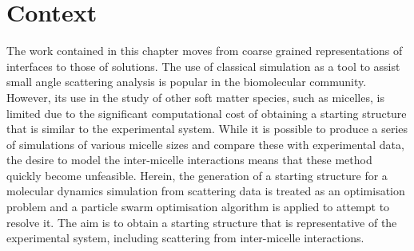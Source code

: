 \section*{Context}
The work contained in this chapter moves from coarse grained representations of interfaces to those of solutions.
The use of classical simulation as a tool to assist small angle scattering analysis is popular in the biomolecular community.\autocite{perkins_atomistic_2016,hub_interpreting_2018}
However, its use in the study of other soft matter species, such as micelles, is limited due to the significant computational cost of obtaining a starting structure that is similar to the experimental system.
While it is possible to produce a series of simulations of various micelle sizes and compare these with experimental data, the desire to model the inter-micelle interactions means that these method quickly become unfeasible.
Herein, the generation of a starting structure for a molecular dynamics simulation from scattering data is treated as an optimisation problem and a particle swarm optimisation algorithm is applied to attempt to resolve it.
The aim is to obtain a starting structure that is representative of the experimental system, including scattering from inter-micelle interactions.
